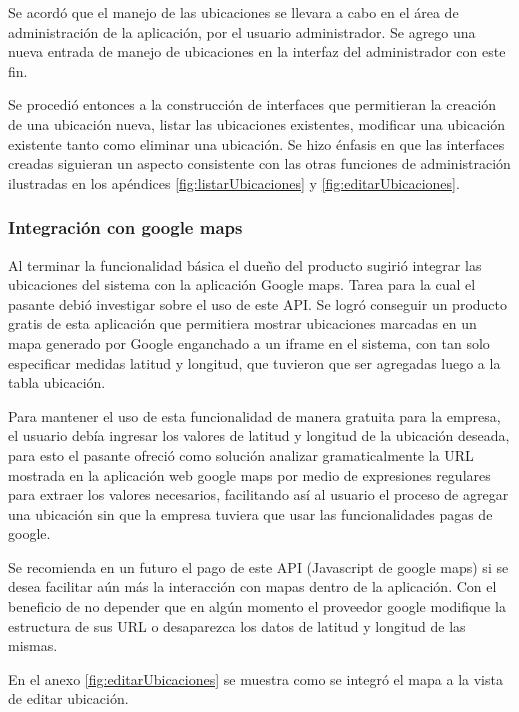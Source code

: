 Se acordó que el manejo de las ubicaciones se llevara a cabo en el área de administración de la aplicación, por el usuario administrador. Se agrego una nueva entrada de manejo de ubicaciones en la interfaz del administrador con este fin.

Se procedió entonces a la construcción de interfaces que permitieran la creación de una ubicación nueva, listar las ubicaciones existentes, modificar una ubicación existente tanto como eliminar una ubicación. Se hizo énfasis en que las interfaces creadas siguieran un aspecto consistente con las otras funciones de administración ilustradas en los apéndices \ref{fig:listarUbicaciones} y \ref{fig:editarUbicaciones}.

\subsubsection{Integración con google maps}

Al terminar la funcionalidad básica el dueño del producto sugirió integrar las ubicaciones del sistema con la aplicación Google maps. Tarea para la cual el pasante debió investigar sobre el uso de este API. Se logró conseguir un producto gratis de esta aplicación que permitiera mostrar ubicaciones marcadas en un mapa generado por Google enganchado a un iframe en el sistema, con tan solo especificar medidas latitud y longitud, que tuvieron que ser agregadas luego a la tabla ubicación.

Para mantener el uso de esta funcionalidad de manera gratuita para la empresa, el usuario debía ingresar los valores de latitud y longitud de la ubicación deseada, para esto el pasante ofreció como solución analizar gramaticalmente la URL mostrada en la aplicación web google maps por medio de expresiones regulares para extraer los valores necesarios, facilitando así al usuario el proceso de agregar una ubicación sin que la empresa tuviera que usar las funcionalidades pagas de google.

Se recomienda en un futuro el pago de este API (Javascript de google maps) si se desea facilitar aún más la interacción con mapas dentro de la aplicación. Con el beneficio de no depender que en algún momento el proveedor google modifique la estructura de sus URL o desaparezca los datos de latitud y longitud de las mismas.

En el anexo \ref{fig:editarUbicaciones} se muestra como se integró el mapa a la vista de editar ubicación.






